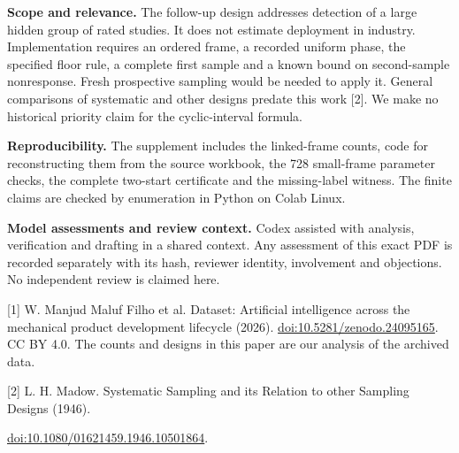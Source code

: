 \documentclass[11pt]{article}
\begin{document}
\textbf{Scope and relevance.} The follow-up design addresses detection of a large hidden group of rated studies. It does not estimate deployment in industry. Implementation requires an ordered frame, a recorded uniform phase, the specified floor rule, a complete first sample and a known bound on second-sample nonresponse. Fresh prospective sampling would be needed to apply it. General comparisons of systematic and other designs predate this work [2]. We make no historical priority claim for the cyclic-interval formula.

\textbf{Reproducibility.} The supplement includes the linked-frame counts, code for reconstructing them from the source workbook, the 728 small-frame parameter checks, the complete two-start certificate and the missing-label witness. The finite claims are checked by enumeration in Python on Colab Linux.

\textbf{Model assessments and review context.} Codex assisted with analysis, verification and drafting in a shared context. Any assessment of this exact PDF is recorded separately with its hash, reviewer identity, involvement and objections. No independent review is claimed here.

\small [1] W. Manjud Maluf Filho et al. Dataset: Artificial intelligence across the mechanical product development lifecycle (2026). \href{https://doi.org/10.5281/zenodo.24095165}{doi:10.5281/zenodo.24095165}. CC BY 4.0. The counts and designs in this paper are our analysis of the archived data.

[2] L. H. Madow. Systematic Sampling and its Relation to other Sampling Designs (1946).\par\noindent\href{https://doi.org/10.1080/01621459.1946.10501864}{doi:10.1080/01621459.1946.10501864}.
\end{document}

